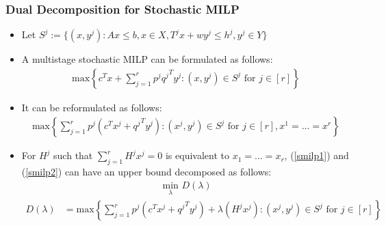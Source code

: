 \documentclass{beamer}
\begin{document}
	\begin{frame}[t]
		\frametitle{Dual Decomposition for Stochastic MILP}
		\small
		\vspace{-.25cm}
		\begin{itemize}
			\item Let $ S^j := \{(x, y^j): Ax \leq b, x \in X, T^j x + w y^j \leq h^j, y^j \in Y\} $
			\item A multistage stochastic MILP can be formulated as follows:
			\begin{align}
				\text{max} \left\{ c^T x + \sum_{j=1}^{r} p^j {q^j}^T y^j : (x, y^j) \in S^j \text{ for } j \in [r] \right\} \label{smilp1}
			\end{align}
			\item It can be reformulated as follows:
			\begin{align}
				\text{max} \left\{ \sum_{j=1}^{r} p^j (c^T x^j + {q^j}^T y^j) : (x^j, y^j) \in S^j \text{ for } j \in [r], x^1 = ... = x^r \right\} \label{smilp2}
			\end{align}
			\item For $ H^j $ such that $ \sum_{j=1}^{r} H^j x^j = 0 $ is equivalent to $ x_1 = ... = x_r $, (\ref{smilp1}) and (\ref{smilp2}) can have an upper bound decomposed as follows:
			\begin{align}
				& \qquad \qquad \qquad \qquad \qquad \underset{\lambda}{\text{ min }} D(\lambda) \label{LD} \tag{LD} \\
				D(\lambda) &= \text{max} \left\{ \sum_{j=1}^{r} p^j (c^T x^j + {q^j}^T y^j) + \lambda(H^j x^j) : (x^j, y^j) \in S^j \text{ for } j \in [r] \right\} \nonumber
			\end{align}
		\end{itemize}
		\normalsize
	\end{frame}
	
\end{document}
